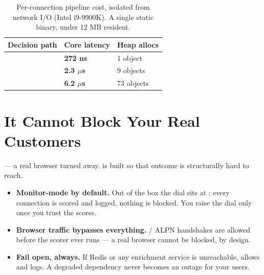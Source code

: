\begin{table}[ht]
  \small
  \begin{tabularx}{\linewidth}{L{3.5cm} R{2.5cm} R{2.5cm}}
    \toprule
    \textbf{Decision path} & \textbf{Core latency} & \textbf{Heap allocs} \\
    \midrule
        & \textbf{272 ns} & 1 object \\[3pt]
      & \textbf{2.3 $\mu$s} & 9 objects \\[3pt]
          & \textbf{6.2 $\mu$s} & 73 objects \\
    \bottomrule
  \end{tabularx}
  \caption{Per-connection pipeline cost, isolated from network I/O
           (Intel i9-9900K). A single static binary, under 12 MB resident.}
\end{table}

\section{It Cannot Block Your Real Customers}

 --- a
real browser turned away. \ja{} is built so that outcome is structurally hard to
reach.

\begin{itemize}
  \item \textbf{Monitor-mode by default.} Out of the box the dial sits at
        \dialzero{}: every connection is scored and logged, nothing is blocked.
        You raise the dial only once you trust the scores.
  \item \textbf{Browser traffic bypasses everything.} / ALPN
        handshakes are allowed before the scorer ever runs --- a real browser
        cannot be blocked, by design.
  \item \textbf{Fail open, always.} If Redis or any enrichment service is
        unreachable, \ja{} allows and logs. A degraded dependency never becomes
        an outage for your users.
\end{itemize}


